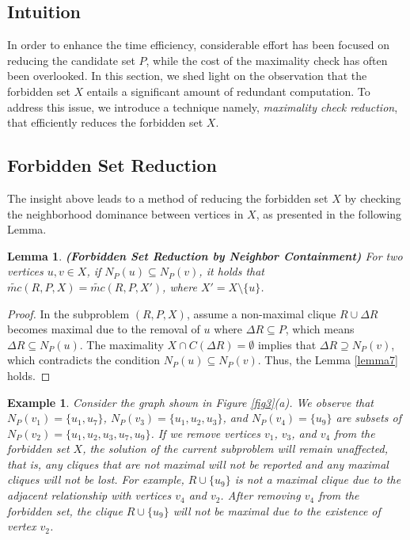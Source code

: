 \documentclass[sigconf, nonacm]{acmart}
\newtheorem{lem}[thm]{\bf Lemma}
\newtheorem{exmp}{Example}%
\begin{document}
\subsection{Intuition}

In order to enhance the time efficiency, 
considerable effort has been focused on reducing the candidate set $P$, while the cost of the maximality check has often been overlooked. 
In this section, we shed light on the observation that the forbidden set $X$ entails a significant amount of redundant computation. To address this issue, we introduce a technique namely, \textit{maximality check reduction}, that efficiently reduces %
the forbidden set $X$. %



\subsection{Forbidden Set Reduction}

The insight above leads to a method of reducing the forbidden set $X$ by checking the neighborhood dominance between vertices in $X$, as presented in the following Lemma.  

\begin{lem}{\textbf{(Forbidden Set Reduction by Neighbor Containment)}}
\textit{
For two vertices $u,v \in X$, if $N_P(u) \subseteq N_P(v)$, it holds that $\tilde{mc}(R,P,X) = \tilde{mc}(R,P,X')$, where $X' = X\setminus\{u\}$.
\label{lemma7}}
\end{lem}
\begin{proof}
    In the subproblem $(R,P,X)$, assume a non-maximal clique $R\cup\Delta R$ becomes maximal due to the removal of $u$ where $\Delta R \subseteq P$, which means $\Delta R \subseteq N_P(u)$. The maximality $X\cap C(\Delta R)=\emptyset$ implies that $\Delta R \supseteq N_P(v)$, which contradicts the condition $N_P(u) \subseteq N_P(v)$. 
    Thus, the Lemma \ref{lemma7} holds.
\end{proof}

\begin{exmp}
    \textit{
    Consider the graph shown in Figure \ref{fig3}(a). We observe that $N_P(v_1) = \{u_1, u_7\}$, $N_P(v_3) = \{u_1,u_2,u_3\}$, and $N_P(v_4) = \{u_9\}$ are subsets of $N_P(v_2) = \{u_1,u_2,u_3, u_7,u_9\}$. If we remove vertices $v_1$, $v_3$, and $v_4$ from the forbidden set $X$, the solution of the current subproblem will remain unaffected, that is, any cliques that are not maximal will not be reported and any maximal cliques will not be lost. For example, $R\cup\{u_9\}$ is not a maximal clique due to the adjacent relationship with vertices $v_4$ and $v_2$. After removing $v_4$ from the forbidden set, the clique $R\cup\{u_9\}$ will not be maximal due to the existence of vertex $v_2$.
    }
\end{exmp}
\end{document}
